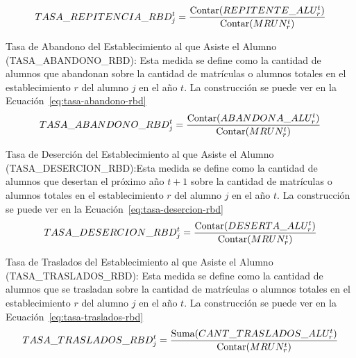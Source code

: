 \begin{longdescription}
\begin{longdescription}
             \begin{equation}
              \centering
                TASA\_REPITENCIA\_RBD_{j}^{t} = \frac{\mbox{Contar}(REPITENTE\_ALU_{r}^{t})}
                {\mbox{Contar}(MRUN_{r}^{t})}
                \label{eq:tasa-repitencia-rbd}
              \end{equation}
              \item[Tasa de Abandono del Establecimiento al que Asiste el Alumno](TASA\_ABANDONO\_RBD): Esta medida se define como la cantidad de alumnos que abandonan sobre la cantidad de matrículas o alumnos totales en el establecimiento $r$ del alumno $j$ en el año $t$. La construcción se puede ver en la Ecuación~\ref{eq:tasa-abandono-rbd}
              \begin{equation}
              \centering
                TASA\_ABANDONO\_RBD_{j}^{t} = \frac{\mbox{Contar}(ABANDONA\_ALU_{r}^{t})}
                {\mbox{Contar}(MRUN_{r}^{t})}
                \label{eq:tasa-abandono-rbd}
              \end{equation}
              \item[Tasa de Deserción del Establecimiento al que Asiste el Alumno](TASA\_DESERCION\_RBD):Esta medida se define como la cantidad de alumnos que desertan el próximo año $t+1$ sobre la cantidad de matrículas o alumnos totales en el establecimiento $r$ del alumno $j$ en el año $t$. La construcción se puede ver en la Ecuación~\ref{eq:tasa-desercion-rbd}
             \begin{equation}
              \centering
                TASA\_DESERCION\_RBD_{j}^{t} = \frac{\mbox{Contar}(DESERTA\_ALU_{r}^{t})}
                {\mbox{Contar}(MRUN_{r}^{t})}
                \label{eq:tasa-desercion-rbd}
              \end{equation}
              \item[Tasa de Traslados del Establecimiento al que Asiste el Alumno](TASA\_TRASLADOS\_RBD): Esta medida se define como la cantidad de alumnos que se trasladan sobre la cantidad de matrículas o alumnos totales en el establecimiento $r$ del alumno $j$ en el año $t$. La construcción se puede ver en la Ecuación~\ref{eq:tasa-traslados-rbd}
              \begin{equation}
              \centering
                TASA\_TRASLADOS\_RBD_{j}^{t} = \frac{\mbox{Suma}(CANT\_TRASLADOS\_ALU_{r}^{t})}
                {\mbox{Contar}(MRUN_{r}^{t})}
                \label{eq:tasa-traslados-rbd}
              \end{equation}
            \end{longdescription}

\end{longdescription}
